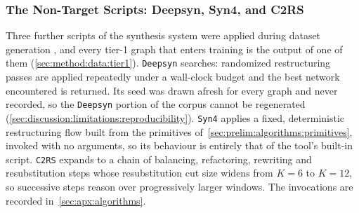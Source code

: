 \subsubsection{The Non-Target Scripts: Deepsyn, Syn4, and C2RS}
\label{sec:prelim:algorithms:others}
Three further scripts of the synthesis system were applied during dataset generation
\citep{brayton2010abc}, and every tier-1 graph that enters training is the output of one of
them (\ref{sec:method:data:tier1}). \texttt{Deepsyn} searches: randomized restructuring passes
are applied repeatedly under a wall-clock budget and the best network encountered is
returned. Its seed was drawn afresh for every graph and never recorded, so the
\texttt{Deepsyn} portion of the corpus cannot be regenerated
(\ref{sec:discussion:limitations:reproducibility}). \texttt{Syn4} applies a fixed,
deterministic restructuring flow built from the primitives
of~\ref{sec:prelim:algorithms:primitives}, invoked with no arguments, so its behaviour is
entirely that of the tool's built-in script. \texttt{C2RS} expands to a chain of balancing,
refactoring, rewriting and resubstitution steps \citep{mishchenko2006scalable} whose
resubstitution cut size widens from $K = 6$ to $K = 12$, so successive steps reason over
progressively larger windows. The invocations are recorded in~\ref{sec:apx:algorithms}.
